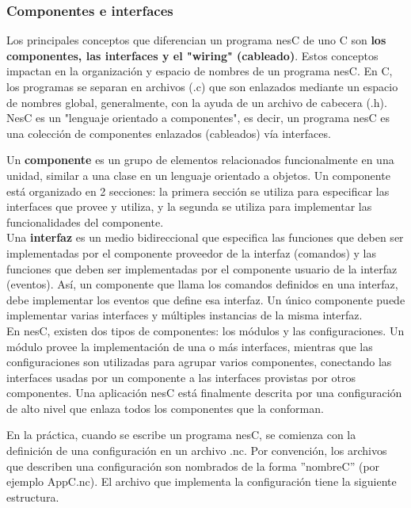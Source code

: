 \subsubsection{Componentes e interfaces}
Los principales conceptos que diferencian un programa nesC de uno C son \textbf{los componentes, las interfaces y el "wiring" (cableado)}. Estos conceptos impactan en la organización y espacio de nombres de un programa nesC. En C, los programas se separan en archivos (.c) que son enlazados mediante un espacio de nombres global, generalmente, con la ayuda de un archivo de cabecera (.h). NesC es un "lenguaje orientado a componentes", es decir, un programa nesC es una colección de componentes enlazados (cableados) vía interfaces. 

Un \textbf{componente} es un grupo de elementos relacionados funcionalmente en una unidad, similar a una clase en un lenguaje orientado a objetos. Un componente está organizado en 2 secciones: la primera sección se utiliza para especificar las interfaces que provee y utiliza, y la segunda se utiliza para implementar las funcionalidades del componente.\\

Una \textbf{interfaz} es un medio bidireccional que especifica las funciones que deben ser implementadas por el componente proveedor de la interfaz (comandos) y las funciones que deben ser implementadas por el componente usuario de la interfaz (eventos). Así, un componente que llama los comandos definidos en una interfaz, debe implementar los eventos que define esa interfaz. Un único componente puede implementar varias interfaces y múltiples instancias de la misma interfaz.\\

En nesC, existen dos tipos de componentes: los módulos y las configuraciones. Un módulo provee la implementación de una o más interfaces, mientras que las configuraciones son utilizadas para agrupar varios componentes, conectando las interfaces usadas por un componente a las interfaces provistas por otros componentes. Una aplicación nesC está finalmente descrita por una configuración de alto nivel que enlaza todos los componentes que la conforman.

En la práctica, cuando se escribe un programa nesC, se comienza con la definición de una configuración en un archivo .nc. Por convención, los archivos que describen una configuración son nombrados de la forma ''nombreC'' (por ejemplo AppC.nc). El archivo que implementa la configuración tiene la siguiente estructura.

